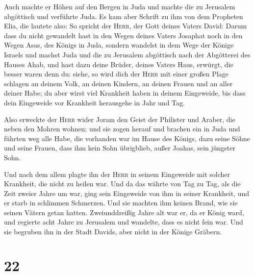  Auch machte er Höhen auf den Bergen in Juda und machte
die zu Jerusalem abgöttisch und verführte Juda.  Es kam
aber Schrift zu ihm von dem Propheten Elia, die lautete also: So spricht
der \textsc{Herr}, der Gott deines Vaters David: Darum dass du nicht
gewandelt hast in den Wegen deines Vaters Josaphat noch in den Wegen
Asas, des Königs in Juda,  sondern wandelst in dem Wege
der Könige Israels und machst Juda und die zu Jerusalem abgöttisch nach
der Abgötterei des Hauses Ahab, und hast dazu deine Brüder, deines
Vaters Haus, erwürgt, die besser waren denn du:  siehe,
so wird dich der \textsc{Herr} mit einer großen Plage schlagen an deinem
Volk, an deinen Kindern, an deinen Frauen und an aller deiner Habe;
 du aber wirst viel Krankheit haben in deinem Eingeweide,
bis dass dein Eingeweide vor Krankheit herausgehe in Jahr und Tag.

 Also erweckte der \textsc{Herr} wider Joram den Geist
der Philister und Araber, die neben den Mohren wohnen; 
und sie zogen herauf und brachen ein in Juda und führten weg alle Habe,
die vorhanden war im Hause des Königs, dazu seine Söhne und seine
Frauen, dass ihm kein Sohn übrigblieb, außer Joahas, sein jüngster Sohn.

 Und nach dem allem plagte ihn der \textsc{Herr} in
seinem Eingeweide mit solcher Krankheit, die nicht zu heilen war.
 Und da das währte von Tag zu Tag, als die Zeit zweier
Jahre um war, ging sein Eingeweide von ihm in seiner Krankheit, und er
starb in schlimmen Schmerzen. Und sie machten ihm keinen Brand, wie sie
seinen Vätern getan hatten.  Zweiunddreißig Jahre alt war
er, da er König ward, und regierte acht Jahre zu Jerusalem und wandelte,
dass es nicht fein war. Und sie begruben ihn in der Stadt Davids, aber
nicht in der Könige Gräbern.

\hypertarget{section-21}{%
\section{22}\label{section-21}}

